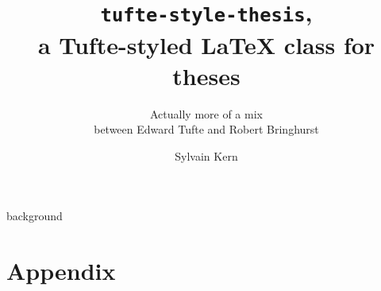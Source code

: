 \documentclass[
    11pt,
	colorful,
	boxey,
 a4paper
]{tufte-style-thesis}
\author{Sylvain Kern}
\title{\texttt{tufte-style-thesis},\\a Tufte-styled \LaTeX{} class for theses}
\subtitle{Actually more of a mix\\between Edward Tufte and Robert Bringhurst}
\begin{document}
\ifdebug
    \layout
\fi


\frontmatter

%
%
%


\mainmatter

{background}
\backmatter

\thispagestyle{empty}
\printbibliography
\cleardoublepage

\part*{Appendix}

\setcounter{table}{0}
\setcounter{figure}{0}

\renewcommand{\thetable}{A\arabic{table}}  %
\renewcommand{\thefigure}{A\arabic{figure}}  %


\cleardoublepage


\begin{wide}
\thispagestyle{empty}
\printindex
\end{wide}
\end{document}
